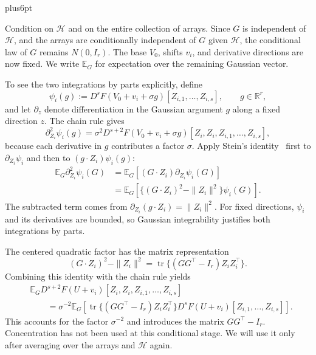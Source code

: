\documentclass[11pt,letterpaper,twoside,leqno]{article}
\makeatletter
\theoremstyle{bookplain}
\theoremstyle{bookremark}
\renewenvironment{proof}[1][\proofname]{\par
  \pushQED{\qed}\normalfont\topsep6pt plus6pt\relax
  \trivlist\item[\hskip\labelsep\bfseries #1\@addpunct{.}]\ignorespaces
}{\popQED\endtrivlist\@endpefalse}
\newcommand{\E}{\mathbb E}
\newcommand{\R}{\mathbb R}
\newcommand{\tr}{\operatorname{tr}}
\makeatother
\begin{document}
\begin{proof}
Condition on $\mathcal H$ and on the entire collection of arrays.
Since $G$ is independent of $\mathcal H$, and the arrays are
conditionally independent of $G$ given $\mathcal H$, the
conditional law of $G$ remains $N(0,I_r)$. The base $V_0$, shifts
$v_i$, and derivative directions are now fixed. We write $\E_G$
for expectation over the remaining Gaussian vector.

To see the two integrations by parts explicitly, define
\[
 \psi_i(g):=D^sF(V_0+v_i+\sigma g)
                  [Z_{i,1},\ldots,Z_{i,s}],\qquad g\in\R^r,
\]
and let $\partial_z$ denote differentiation in the Gaussian
argument $g$ along a fixed direction $z$. The chain rule gives
\[
 \partial_{Z_i}^2\psi_i(g)
 =\sigma^2D^{s+2}F(V_0+v_i+\sigma g)
                  [Z_i,Z_i,Z_{i,1},\ldots,Z_{i,s}],
\]
because each derivative in $g$ contributes a factor $\sigma$.
Apply Stein's identity~\cite{Stein1981} first to
$\partial_{Z_i}\psi_i$ and then to $(g\cdot Z_i)\psi_i(g)$:
\begin{align*}
 \E_G\partial_{Z_i}^2\psi_i(G)
 &=\E_G[(G\cdot Z_i)\partial_{Z_i}\psi_i(G)]\\
 &=\E_G[\{(G\cdot Z_i)^2-\|Z_i\|^2\}\psi_i(G)].
\end{align*}
The subtracted term comes from
$\partial_{Z_i}(g\cdot Z_i)=\|Z_i\|^2$. For fixed directions,
$\psi_i$ and its derivatives are bounded, so Gaussian
integrability justifies both integrations by parts.

The centered quadratic factor has the matrix representation
\[
 (G\cdot Z_i)^2-\|Z_i\|^2
 =\tr\{(GG^\top-I_r)Z_iZ_i^\top\}.
\]
Combining this identity with the chain rule yields
\begin{align*}
 &\E_G D^{s+2}F(U+v_i)[Z_i,Z_i,Z_{i,1},\ldots,Z_{i,s}]\\
 &\qquad=\sigma^{-2}\E_G\left[
       \tr\{(GG^\top-I_r)Z_iZ_i^\top\}
       D^sF(U+v_i)[Z_{i,1},\ldots,Z_{i,s}]\right].
\end{align*}
This accounts for the factor $\sigma^{-2}$ and introduces the
matrix $GG^\top-I_r$. Concentration has not been used at this
conditional stage. We will use it only after averaging over the
arrays and $\mathcal H$ again.


\end{proof}
\end{document}

